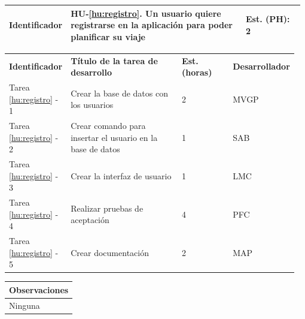 \documentclass[11pt]{article}
\begin{document}
\begin{longtable}{p{0.18\linewidth}|p{0.6\linewidth}|p{0.2\linewidth}}
  \rowcolor{LightCyan}
  \textbf{Identificador} & \textbf{HU-\ref{hu:registro}}. Un usuario quiere registrarse en la aplicación para poder planificar su viaje & \textbf{Est. (PH):} 2 \\  
  \bottomrule
\end{longtable}
\vspace{-0.5cm}
\begin{longtable}{p{0.18\linewidth}|p{0.4\linewidth}|p{0.18\linewidth}|p{0.2\linewidth}}
  \toprule
  \textbf{Identificador} & \textbf{Título de la tarea de desarrollo} & \textbf{Est. (horas)} & \textbf{Desarrollador} \\
  Tarea \ref{hu:registro} - 1 & Crear la base de datos con los usuarios & 2 & MVGP\\
  Tarea \ref{hu:registro} - 2 & Crear comando para insertar el usuario en la base de datos & 1 & SAB\\
  Tarea \ref{hu:registro} - 3 & Crear la interfaz de usuario & 1 & LMC\\
  Tarea \ref{hu:registro} - 4 & Realizar pruebas de aceptación & 4 & PFC \\
  Tarea \ref{hu:registro} - 5 & Crear documentación & 2 & MAP\\
  \bottomrule
\end{longtable}
\vspace{-0.5cm}
\begin{longtable}{p{1.028\linewidth}}
  \textbf{Observaciones}\\
  \midrule
  Ninguna\\
  \bottomrule
\end{longtable}
\end{document}
